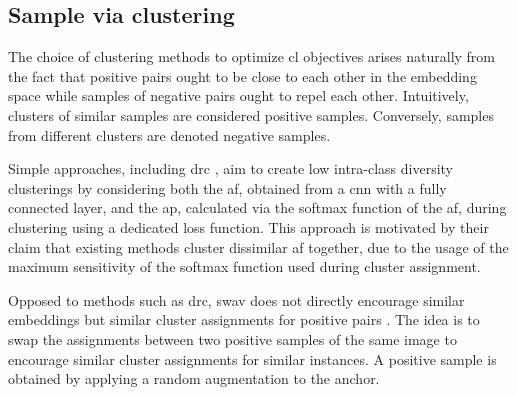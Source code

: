 \subsection{Sample via clustering}
\label{subsec:SampleViaClustering}

The choice of clustering methods to optimize \ac{cl} objectives 
arises naturally from the fact that positive pairs ought to be close 
to each other in the embedding space 
while samples of negative pairs ought to repel each other.
Intuitively, clusters of similar samples are considered positive samples.
Conversely, samples from different clusters are denoted negative samples.

Simple approaches, including \ac{drc} \citet{DRC_2020}, aim to create low intra-class diversity clusterings 
by considering both the \ac{af}, obtained from a \ac{cnn} with a fully connected layer, 
and the \ac{ap}, calculated via the softmax function of the \ac{af}, 
during clustering using a dedicated loss function.
This approach is motivated by their claim that existing methods cluster dissimilar \ac{af} together,
due to the usage of the maximum sensitivity of the softmax function used during cluster assignment.

Opposed to methods such as \ac{drc}, \ac{swav} does not directly encourage similar embeddings 
but similar 
cluster assignments for positive pairs \citet{swav_2020}.
The idea is to swap the assignments between two positive samples of the same image to encourage 
similar cluster assignments for similar instances.
A positive sample is obtained by applying a random augmentation to the anchor.





